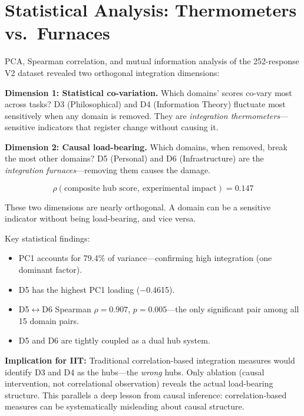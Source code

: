 \documentclass[12pt,letterpaper]{article}
\begin{document}
\section{Statistical Analysis: Thermometers vs.\ Furnaces}
\label{sec:stats}

PCA, Spearman correlation, and mutual information analysis of the 252-response V2 dataset revealed two orthogonal integration dimensions:

\textbf{Dimension 1: Statistical co-variation.} Which domains' scores co-vary most across tasks? D3 (Philosophical) and D4 (Information Theory) fluctuate most sensitively when any domain is removed. They are \emph{integration thermometers}---sensitive indicators that register change without causing it.

\textbf{Dimension 2: Causal load-bearing.} Which domains, when removed, break the most other domains? D5 (Personal) and D6 (Infrastructure) are the \emph{integration furnaces}---removing them causes the damage.

\begin{equation}
\rho(\text{composite hub score},\ \text{experimental impact}) = 0.147
\end{equation}

These two dimensions are nearly orthogonal. A domain can be a sensitive indicator without being load-bearing, and vice versa.

Key statistical findings:
\begin{itemize}[nosep]
  \item PC1 accounts for 79.4\% of variance---confirming high integration (one dominant factor).
  \item D5 has the highest PC1 loading ($-$0.4615).
  \item D5$\leftrightarrow$D6 Spearman $\rho = 0.907$, $p = 0.005$---the only significant pair among all 15 domain pairs.
  \item D5 and D6 are tightly coupled as a dual hub system.
\end{itemize}

\textbf{Implication for IIT:} Traditional correlation-based integration measures would identify D3 and D4 as the hubs---the \emph{wrong} hubs. Only ablation (causal intervention, not correlational observation) reveals the actual load-bearing structure. This parallels a deep lesson from causal inference: correlation-based measures can be systematically misleading about causal structure.
\end{document}
